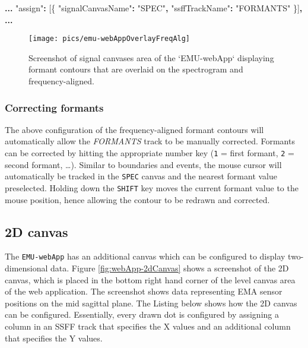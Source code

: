 \documentclass[
]{book}
\newenvironment{Shaded}{\begin{snugshade}}{\end{snugshade}}
\newcommand{\NormalTok}[1]{#1}
\newcommand{\OperatorTok}[1]{\textcolor[rgb]{0.81,0.36,0.00}{\textbf{#1}}}
\newcommand{\StringTok}[1]{\textcolor[rgb]{0.31,0.60,0.02}{#1}}
\begin{document}
\begin{Shaded}
\begin{Highlighting}[]
\OperatorTok{...}
\StringTok{"assign"}\OperatorTok{:}\NormalTok{ [\{}
    \StringTok{"signalCanvasName"}\OperatorTok{:} \StringTok{"SPEC"}\OperatorTok{,}
    \StringTok{"ssffTrackName"}\OperatorTok{:} \StringTok{"FORMANTS"}
\NormalTok{\}]}\OperatorTok{,}
\OperatorTok{...}
\end{Highlighting}
\end{Shaded}

\begin{figure}

{\centering \texttt{[image: pics/emu-webAppOverlayFreqAlg]} 

}

\caption{Screenshot of signal canvases area of the `EMU-webApp` displaying formant contours that are overlaid on the spectrogram and frequency-aligned.}\label{fig:webApp-overlay2}
\end{figure}

\hypertarget{correcting-formants}{%
\subsubsection*{Correcting formants}\label{correcting-formants}}

The above configuration of the frequency-aligned formant contours will automatically allow the \emph{FORMANTS} track to be manually corrected. Formants can be corrected by hitting the appropriate number key (\texttt{1} = first formant, \texttt{2} = second formant, \ldots). Similar to boundaries and events, the mouse cursor will automatically be tracked in the \texttt{SPEC} canvas and the nearest formant value preselected. Holding down the \texttt{SHIFT} key moves the current formant value to the mouse position, hence allowing the contour to be redrawn and corrected.

\hypertarget{d-canvas}{%
\subsection{2D canvas}\label{d-canvas}}

The \texttt{EMU-webApp} has an additional canvas which can be configured to display two-dimensional data. Figure \ref{fig:webApp-2dCanvas} shows a screenshot of the 2D canvas, which is placed in the bottom right hand corner of the level canvas area of the web application. The screenshot shows data representing EMA sensor positions on the mid sagittal plane. The Listing below shows how the 2D canvas can be configured. Essentially, every drawn dot is configured by assigning a column in an SSFF track that specifies the X values and an additional column that specifies the Y values.
\end{document}
